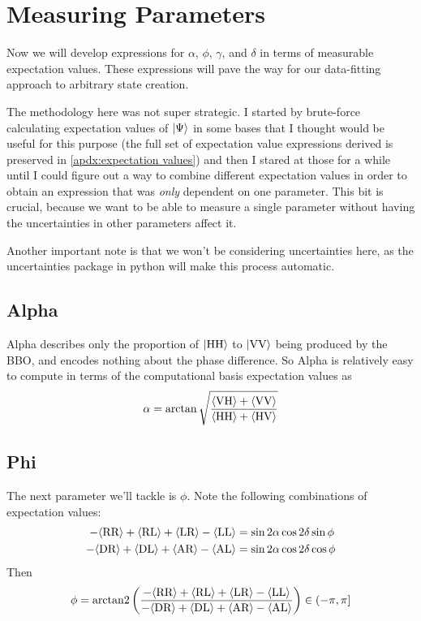 \documentclass{paper}[11pt]
\begin{document}
	\section{Measuring Parameters}
	
	Now we will develop expressions for $\alpha$, $\phi$, $\gamma$, and $\delta$ in terms of measurable expectation values. These expressions will pave the way for our data-fitting approach to arbitrary state creation.
	
	The methodology here was not super strategic. I started by brute-force calculating expectation values of $\ket{\Psi}$ in some bases that I thought would be useful for this purpose (the full set of expectation value expressions derived is preserved in \cref{apdx:expectation values}) and then I stared at those for a while until I could figure out a way to combine different expectation values in order to obtain an expression that was \textit{only} dependent on one parameter. This bit is crucial, because we want to be able to measure a single parameter without having the uncertainties in other parameters affect it.
	
	Another important note is that we won't be considering uncertainties here, as the uncertainties package in python will make this process automatic.

	\subsection{Alpha}
	Alpha describes only the proportion of $\ket{\text{HH}}$ to $\ket{\text{VV}}$ being produced by the BBO, and encodes nothing about the phase difference. So 
	Alpha is relatively easy to compute in terms of the computational basis expectation values as
	\begin{equation}
		\alpha = \arctan\sqrt{\frac{{\langle{\text{VH}}\rangle} + {\langle{\text{VV}}\rangle}}{{\langle{\text{HH}}\rangle} + {\langle{\text{HV}}\rangle}}} \label{eq:experimental alpha}
	\end{equation}
	
	\subsection{Phi}
	The next parameter we'll tackle is $\phi$. Note the following combinations of expectation values:
	\begin{align}
		-{\langle{\text{RR}}\rangle}+{\langle{\text{RL}}\rangle}+{\langle{\text{LR}}\rangle}-{\langle{\text{LL}}\rangle} &= \sin2\alpha\cos2\delta\sin\phi \\
		-{\langle{\text{DR}}\rangle}+{\langle{\text{DL}}\rangle}+{\langle{\text{AR}}\rangle}-{\langle{\text{AL}}\rangle} &= \sin2\alpha\cos2\delta\cos\phi
	\end{align}
	Then
	\begin{equation}
		\phi = \text{\rmfamily arctan2\normalfont}\left(\frac{-{\langle{\text{RR}}\rangle}+{\langle{\text{RL}}\rangle}+{\langle{\text{LR}}\rangle}-{\langle{\text{LL}}\rangle}}{-{\langle{\text{DR}}\rangle}+{\langle{\text{DL}}\rangle}+{\langle{\text{AR}}\rangle}-{\langle{\text{AL}}\rangle}}\right)\in\left(-\pi,\pi\right] \label{eq:experimental phi}
	\end{equation}
	
\end{document}
